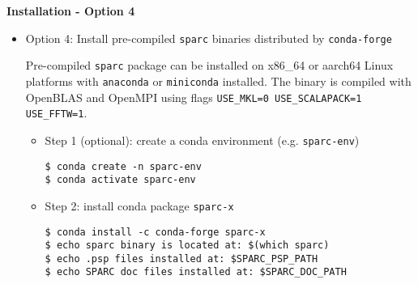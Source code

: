   \begin{frame}{\textbf{Installation - Option 4}} \label{Installation:4}
  \begin{itemize}
  \item Option 4: Install pre-compiled \texttt{sparc} binaries distributed by \texttt{conda-forge}

    Pre-compiled \texttt{sparc} package can be installed on x86\_64 or
    aarch64 Linux platforms with \texttt{anaconda} or
    \texttt{miniconda} installed.  The binary is compiled with
    OpenBLAS and OpenMPI using flags \texttt{USE\_MKL=0 USE\_SCALAPACK=1 USE\_FFTW=1}.
    
    \begin{itemize}
   
    \item  Step 1 (optional): create a conda environment (e.g. \texttt{sparc-env})
\begin{verbatim}
$ conda create -n sparc-env
$ conda activate sparc-env
\end{verbatim}
      
    \item Step 2: install conda package \texttt{sparc-x}
\begin{verbatim}
$ conda install -c conda-forge sparc-x
$ echo sparc binary is located at: $(which sparc)
$ echo .psp files installed at: $SPARC_PSP_PATH
$ echo SPARC doc files installed at: $SPARC_DOC_PATH
\end{verbatim}
    \end{itemize}
  \end{itemize}
  
  \end{frame}
  
  
  
